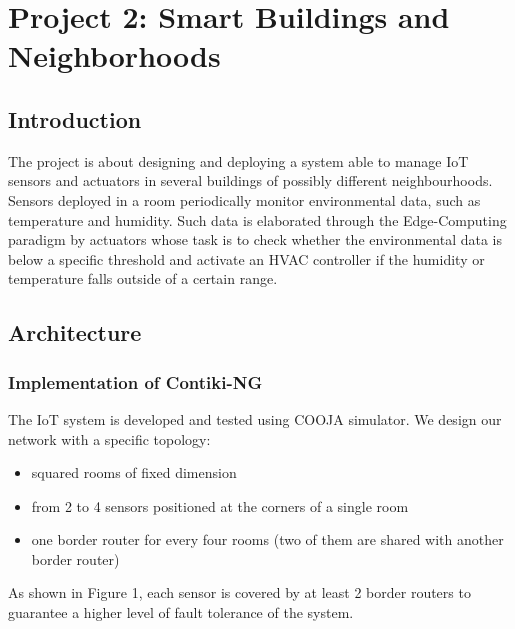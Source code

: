 \documentclass{article}
\begin{document}
\pagebreak

\section{Project 2: Smart Buildings and Neighborhoods}
\subsection{Introduction}
The project is about designing and deploying a system able to manage IoT sensors and actuators in several buildings of possibly different neighbourhoods. Sensors deployed in a room periodically monitor environmental data, such as temperature and humidity. Such data is elaborated through the Edge-Computing paradigm by actuators whose task is to check whether the environmental data is below a specific threshold and activate an HVAC controller if the humidity or temperature falls outside of a certain range. 


\subsection{Architecture}
\subsubsection{Implementation of Contiki-NG}
The IoT system is developed and tested using COOJA simulator. We design our network with a specific topology:
\begin{itemize}
    \item squared rooms of fixed dimension
    \item from 2 to 4 sensors positioned at the corners of a single room 
    \item one border router for every four rooms (two of them are shared with another border router)
\end{itemize}
As shown in Figure 1, each sensor is covered by at least 2 border routers to guarantee a higher level of fault tolerance of the system.
\end{document}
